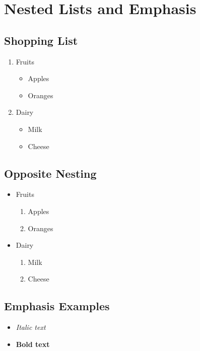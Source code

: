 \documentclass{article}
\begin{document}
    \pagestyle{empty}

\section{Nested Lists and Emphasis}


\subsection{Shopping List}

\begin{enumerate}
    \item Fruits
\begin{itemize}
    \item Apples
    \item Oranges
\end{itemize}
    \item Dairy
\begin{itemize}
    \item Milk
    \item Cheese
\end{itemize}
\end{enumerate}


\subsection{Opposite Nesting}

\begin{itemize}
    \item Fruits
\begin{enumerate}
    \item Apples
    \item Oranges
\end{enumerate}
    \item Dairy
\begin{enumerate}
    \item Milk
    \item Cheese
\end{enumerate}
\end{itemize}


\subsection{Emphasis Examples}

\begin{itemize}
    \item \textit{Italic text}
    \item \textbf{Bold text}
\end{itemize}
\end{document}
